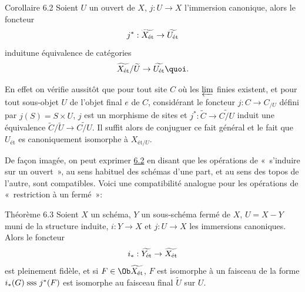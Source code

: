 \documentclass[10pt]{../fichiers-configuration-latex/smfart}
\begin{document}
\begin{enonce*}{Corollaire 6.2}
Soient $U$ un ouvert de $X$, $j : U \to X$ l'immersion canonique,
alors le foncteur
$$
j^{\ast} :  \widetilde{X_{\text{\rm ét}}} \to \widetilde{U_{\text{\rm ét}}}
$$
induit\pageoriginale une équivalence de catégories
$$
\widetilde{X_{\text{\rm ét}}} / \widetilde{U} \to
\widetilde{U_{\text{\rm ét}}}{\quoi}.
$$
\end{enonce*}

En effet on vérifie aussitôt que pour tout site $C$ où les
$\varprojlim$ finies existent, et pour tout sous-objet $U$ de l'objet
final $e$ de $C$, considérant le foncteur $j : C \to C_{/U}$ défini
par $j(S) = S \times U$, $j$ est un morphisme de sites et $j^{\ast} :
\widetilde{C} \to \widetilde{C/U}$ induit une équivalence
$\widetilde{C}/\widetilde{U} \to \widetilde{C / U}$. Il
  suffit alors de conjuguer ce fait général et le fait que $U_{\text{ét}}$ es
  canoniquement isomorphe à $X_{\text{ét}/U}$.

De façon imagée, on peut exprimer \hyperref[VIII.cor6.2]{6.2} en disant que les opérations
de « s'induire sur un ouvert », au sens habituel des schémas d'une
part, et au sens des topos de l'autre, sont compatibles. Voici une
compatibilité analogue pour les opérations de « restriction à un
fermé »:

\begin{enonce*}{Théorème 6.3}
Soient $X$ un schéma, $Y$ un sous-schéma fermé de $X$, $U
= X - Y$ muni de la structure induite, $i : Y \to X$ et $j : U \to X$
les immersions canoniques. Alors le foncteur
$$
i_{\ast} : \widetilde{Y_{\text{\rm ét}}} \to \widetilde{X_{\text{\rm ét}}}
$$
est pleinement fidèle, et si $F \in \Ob \widetilde{X_{\text{\rm ét}}}$, $F$
est isomorphe à un faisceau de la forme $i_{\ast} (G) \text{\;\rm sss } j^{\ast}(F)$
est isomorphe au faisceau final $\widetilde{U}$ sur  $U$.
\end{enonce*}
\end{document}
